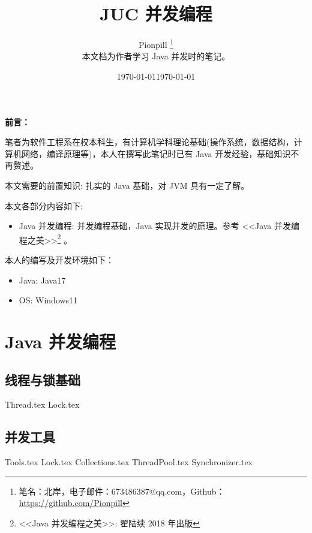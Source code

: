 \documentclass{PionpillNote-book}
\title{JUC 并发编程}
\author{
    Pionpill \footnote{笔名：北岸，电子邮件：673486387@qq.com，Github：\url{https://github.com/Pionpill}} \\
    本文档为作者学习 Java 并发时的笔记。\\
}
\date{\today}
\begin{document}
\pagestyle{plain}
\maketitle

\noindent\textbf{前言：}

笔者为软件工程系在校本科生，有计算机学科理论基础(操作系统，数据结构，计算机网络，编译原理等)，本人在撰写此笔记时已有 Java 开发经验，基础知识不再赘述。

本文需要的前置知识: 扎实的 Java 基础，对 JVM 具有一定了解。

本文各部分内容如下:
\begin{itemize}
    \item Java 并发编程: 并发编程基础，Java 实现并发的原理。参考 <<Java 并发编程之美>>\footnote{<<Java 并发编程之美>>: 翟陆续 2018 年出版} 。
\end{itemize}

本人的编写及开发环境如下：
\begin{itemize}
    \item Java: Java17
    \item OS: Windows11
\end{itemize}

\date{\today}
\newpage

\tableofcontents

\newpage

\setcounter{page}{1} 
\pagestyle{fancy}

\part{Java 并发编程}
\chapter{线程与锁基础}
{Thread.tex}
{Lock.tex}

\chapter{并发工具}
{Tools.tex}
{Lock.tex}
{Collections.tex}
{ThreadPool.tex}
{Synchronizer.tex}
\end{document}
